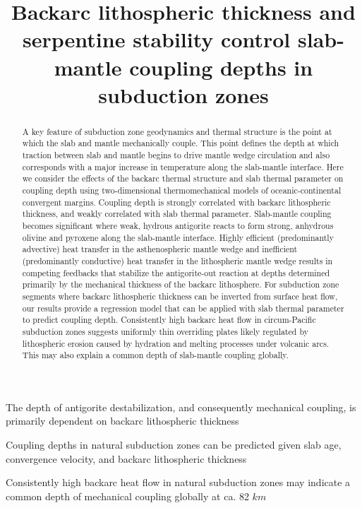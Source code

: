 \documentclass[draft]{assets/agujournal2019}
\begin{document}
\title{Backarc lithospheric thickness and serpentine stability control slab-mantle coupling depths in subduction zones}

\begin{keypoints}
 \item The depth of antigorite destabilization, and consequently mechanical coupling, is primarily dependent on backarc lithospheric thickness
 \item Coupling depths in natural subduction zones can be predicted given slab age, convergence velocity, and backarc lithospheric thickness
 \item Consistently high backarc heat flow in natural subduction zones may indicate a common depth of mechanical coupling globally at ca. 82 $km$
\end{keypoints}

\begin{abstract}
 A key feature of subduction zone geodynamics and thermal structure is the point at which the slab and mantle mechanically couple. This point defines the depth at which traction between slab and mantle begins to drive mantle wedge circulation and also corresponds with a major increase in temperature along the slab-mantle interface. Here we consider the effects of the backarc thermal structure and slab thermal parameter on coupling depth using two-dimensional thermomechanical models of oceanic-continental convergent margins. Coupling depth is strongly correlated with backarc lithospheric thickness, and weakly correlated with slab thermal parameter. Slab-mantle coupling becomes significant where weak, hydrous antigorite reacts to form strong, anhydrous olivine and pyroxene along the slab-mantle interface. Highly efficient (predominantly advective) heat transfer in the asthenospheric mantle wedge and inefficient (predominantly conductive) heat transfer in the lithospheric mantle wedge results in competing feedbacks that stabilize the antigorite-out reaction at depths determined primarily by the mechanical thickness of the backarc lithosphere. For subduction zone segments where backarc lithospheric thickness can be inverted from surface heat flow, our results provide a regression model that can be applied with slab thermal parameter to predict coupling depth. Consistently high backarc heat flow in circum-Pacific subduction zones suggests uniformly thin overriding plates likely regulated by lithospheric erosion caused by hydration and melting processes under volcanic arcs. This may also explain a common depth of slab-mantle coupling globally.
\end{abstract}
\end{document}
